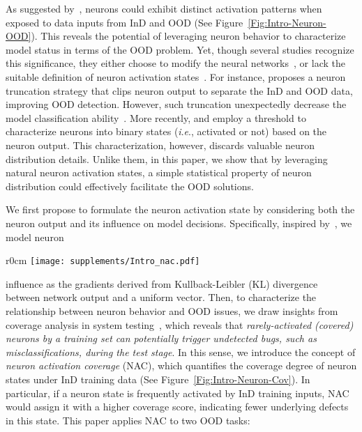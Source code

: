 \documentclass{article} \usepackage{iclr2024_conference,times}
\newcommand{\ie}{\textit{i}.\textit{e}.}
\begin{document}
As suggested by~\cite{OOD_Detect:ReAct,OOD_Detect:LINe}, neurons could exhibit distinct activation patterns when exposed to data inputs from InD and OOD (See Figure~\ref{Fig:Intro-Neuron-OOD}). 
This reveals the potential of leveraging neuron behavior to characterize model status in terms of the OOD problem.
Yet, though several studies recognize this significance, they either choose to modify the neural networks~\citep{OOD_Detect:ReAct}, or lack the suitable definition of 
neuron activation states~\citep{OOD_Detect:LINe,NACT_DG:NeuronCoverage}. 
For instance, \citet{OOD_Detect:ReAct} proposes a neuron truncation strategy that clips neuron output to separate the InD and OOD data, improving OOD detection.
However, such truncation unexpectedly decrease the model classification ability~\citep{OOD_Detect:SimpleAct}. More recently, \citet{OOD_Detect:LINe} and \citet{NACT_DG:NeuronCoverage} employ a threshold to characterize neurons into binary states (\ie, activated or not) based on the neuron output. This characterization, however, discards valuable neuron distribution details. 
Unlike them, in this paper, we show that {by leveraging natural neuron activation states, a simple statistical property of neuron distribution could effectively facilitate the OOD solutions.}










We first propose to formulate the neuron activation state by considering both the neuron output and 
its influence on model decisions. Specifically, inspired by~\citet{OOD_Detect:GradNorm}, we model neuron 
\setlength\intextsep{1pt}
\begin{wrapfigure}[15]{r}{0cm}
	\centering
	\texttt{[image: supplements/Intro\_nac.pdf]}
	\caption{NAC models \textit{coverage area} in neuron activation space using InD training data. Upon receiving OOD data, neurons tend to behave outside the expected coverage area, thus with lower coverage scores. }


\label{Fig:Intro-Neuron-Cov}
\end{wrapfigure}
influence as the gradients derived from Kullback-Leibler (KL) divergence~\citep{tech:KL} between network output and a uniform vector. 
Then, to characterize the relationship between neuron behavior and OOD issues, we draw insights from coverage analysis in system testing~\citep{NACT_System:DeepXplore,NACT_System:DeepGauge}, which reveals that \textit{rarely-activated (covered) neurons by a training set can potentially trigger undetected bugs, such as misclassifications, during the test stage}.
In this sense, we introduce the concept of \textit{neuron activation coverage} ({NAC}), 
which {quantifies the coverage degree of neuron states under InD training data} (See Figure~\ref{Fig:Intro-Neuron-Cov}).
In particular, if a neuron state is frequently activated by InD training inputs, NAC would assign it with a higher coverage score, indicating fewer underlying defects in this state. 
This paper applies NAC to two OOD tasks:
\end{document}
